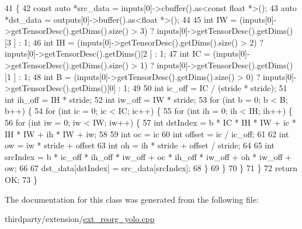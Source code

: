 \begin{DoxyCode}
41                                                              \{
42         \textcolor{keyword}{const} \textcolor{keyword}{auto} *src\_data = inputs[0]->cbuffer().as<\textcolor{keyword}{const} \textcolor{keywordtype}{float} *>();
43         \textcolor{keyword}{auto} *dst\_data = outputs[0]->buffer().as<\textcolor{keywordtype}{float} *>();
44 
45         \textcolor{keywordtype}{int} IW = (inputs[0]->getTensorDesc().getDims().size() > 3) ? inputs[0]->getTensorDesc().getDims()[3
      ] : 1;
46         \textcolor{keywordtype}{int} IH = (inputs[0]->getTensorDesc().getDims().size() > 2) ? inputs[0]->getTensorDesc().getDims()[2
      ] : 1;
47         \textcolor{keywordtype}{int} IC = (inputs[0]->getTensorDesc().getDims().size() > 1) ? inputs[0]->getTensorDesc().getDims()[1
      ] : 1;
48         \textcolor{keywordtype}{int} B = (inputs[0]->getTensorDesc().getDims().size() > 0) ? inputs[0]->getTensorDesc().getDims()[0]
       : 1;
49 
50         \textcolor{keywordtype}{int} ic\_off = IC / (stride * stride);
51         \textcolor{keywordtype}{int} ih\_off = IH * stride;
52         \textcolor{keywordtype}{int} iw\_off = IW * stride;
53         \textcolor{keywordflow}{for} (\textcolor{keywordtype}{int} b = 0; b < B; b++) \{
54             \textcolor{keywordflow}{for} (\textcolor{keywordtype}{int} ic = 0; ic < IC; ic++) \{
55                 \textcolor{keywordflow}{for} (\textcolor{keywordtype}{int} ih = 0; ih < IH; ih++) \{
56                     \textcolor{keywordflow}{for} (\textcolor{keywordtype}{int} iw = 0; iw < IW; iw++) \{
57                         \textcolor{keywordtype}{int} dstIndex = b * IC * IH * IW + ic * IH * IW + ih * IW + iw;
58 
59                         \textcolor{keywordtype}{int} oc = ic %
60                         \textcolor{keywordtype}{int} offset = ic / ic\_off;
61 
62                         \textcolor{keywordtype}{int} ow = iw * stride + offset %
63                         \textcolor{keywordtype}{int} oh = ih * stride + offset / stride;
64 
65                         \textcolor{keywordtype}{int} srcIndex = b * ic\_off * ih\_off * iw\_off + oc * ih\_off * iw\_off + oh * iw\_off + 
      ow;
66 
67                         dst\_data[dstIndex] = src\_data[srcIndex];
68                     \}
69                 \}
70             \}
71         \}
72         \textcolor{keywordflow}{return} OK;
73     \}
\end{DoxyCode}


The documentation for this class was generated from the following file\+:\begin{DoxyCompactItemize}
\item 
thirdparty/extension/\hyperlink{ext__reorg__yolo_8cpp}{ext\+\_\+reorg\+\_\+yolo.\+cpp}\end{DoxyCompactItemize}

